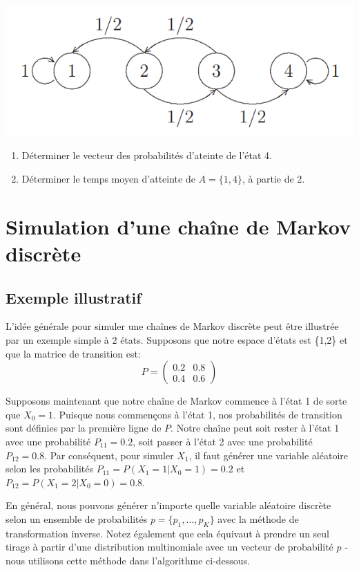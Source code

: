 \documentclass[
]{book}
\providecommand{\tightlist}{%
  \setlength{\itemsep}{0pt}\setlength{\parskip}{0pt}}
\theoremstyle{definition}
\theoremstyle{definition}
\theoremstyle{definition}
\theoremstyle{remark}
\begin{document}
\begin{center}\includegraphics[width=0.45\linewidth]{images/graphe3} \end{center}

\begin{enumerate}
\def\labelenumi{\arabic{enumi})}
\tightlist
\item
  Déterminer le vecteur des probabilités d'ateinte de l'état 4.
\item
  Déterminer le temps moyen d'atteinte de \(A=\{1,4\}\), à partie de 2.
\end{enumerate}

\hypertarget{simulation-dune-chauxeene-de-markov-discruxe8te}{%
\section{Simulation d'une chaîne de Markov discrète}\label{simulation-dune-chauxeene-de-markov-discruxe8te}}

\hypertarget{exemple-illustratif}{%
\subsection{Exemple illustratif}\label{exemple-illustratif}}

L'idée générale pour simuler une chaînes de Markov discrète peut être illustrée par un exemple simple à 2 états. Supposons que notre espace d'états est \{1,2\} et que la matrice de transition est:
\[ P=\left(
\begin{array}{cc}
0.2 & 0.8 \\
0.4 & 0.6
\end{array}
\right)\]

Supposons maintenant que notre chaîne de Markov commence à l'état 1 de sorte que \(X_0 = 1\). Puisque nous commençons à l'état 1, nos probabilités de transition sont définies par la première ligne de \(P\). Notre chaîne peut soit rester à l'état 1 avec une probabilité \(P_{11}=0.2\), soit passer à l'état 2 avec une probabilité \(P_{12}=0.8\). Par conséquent, pour simuler \(X_1\), il faut générer une variable aléatoire selon les probabilités \(P_{11} = P (X_1 = 1 | X_0 = 1) = 0.2\) et \(P_{12} = P (X_1 = 2 | X_0 = 0) = 0.8\).

En général, nous pouvons générer n'importe quelle variable aléatoire discrète selon un ensemble de probabilités \(p = \{p_1,\ldots, p_K\}\) avec la méthode de transformation inverse. Notez également que cela équivaut à prendre un seul tirage à partir d'une distribution multinomiale avec un vecteur de probabilité \(p\) - nous utilisons cette méthode dans l'algorithme ci-dessous.
\end{document}
